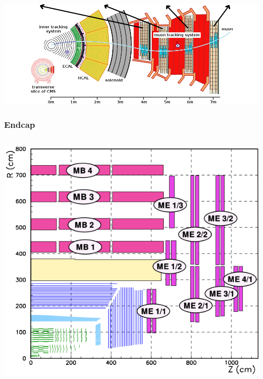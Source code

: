 \documentclass[compress]{beamer}
\begin{document}
\begin{frame}
\includegraphics[width=\linewidth]{cms_slice.png}
\end{frame}

\begin{frame}
\frametitle{Endcap }

\begin{columns}
\includegraphics[width=\linewidth]{muon_system.png}

\end{columns}
\end{frame}
\end{document}
